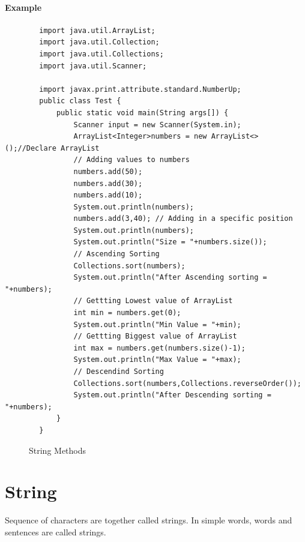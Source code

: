 \documentclass[openany]{book}  %
\begin{document}
\subsubsection{Example}
\begin{center}
    \begin{verbatim}
        import java.util.ArrayList;
        import java.util.Collection;
        import java.util.Collections;
        import java.util.Scanner;

        import javax.print.attribute.standard.NumberUp;
        public class Test {
            public static void main(String args[]) {
                Scanner input = new Scanner(System.in);
                ArrayList<Integer>numbers = new ArrayList<>();//Declare ArrayList
                // Adding values to numbers
                numbers.add(50);
                numbers.add(30);
                numbers.add(10);
                System.out.println(numbers); 
                numbers.add(3,40); // Adding in a specific position
                System.out.println(numbers); 
                System.out.println("Size = "+numbers.size());
                // Ascending Sorting
                Collections.sort(numbers);
                System.out.println("After Ascending sorting = "+numbers);
                // Gettting Lowest value of ArrayList
                int min = numbers.get(0);
                System.out.println("Min Value = "+min);
                // Gettting Biggest value of ArrayList
                int max = numbers.get(numbers.size()-1);
                System.out.println("Max Value = "+max);
                // Descendind Sorting
                Collections.sort(numbers,Collections.reverseOrder());
                System.out.println("After Descending sorting = "+numbers);
            }
        }
    \end{verbatim}
\end{center}
% 
% 
\begin{figure}[htbp]
    \begin{center}
        \caption{String Methods\cite{Ref3}}
    \end{center}
\end{figure}
% 
% 
\chapter{String}
Sequence of characters are together called strings. In simple words, words and \\
sentences are called strings.
% 
% 
\end{document}
